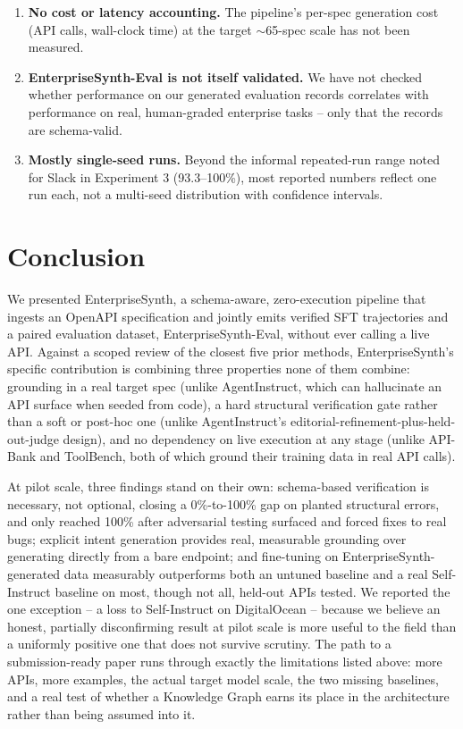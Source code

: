 \documentclass[11pt]{article}
\begin{document}
\begin{enumerate}
    data loses to a real Self-Instruct baseline on one of three held-out APIs (DigitalOcean); the
    proposed explanation (structural similarity to GitHub, which Self-Instruct's bootstrap leaned
    on) is a hypothesis, not a confirmed finding.
    \item \textbf{No cost or latency accounting.} The pipeline's per-spec generation cost (API
    calls, wall-clock time) at the target $\sim$65-spec scale has not been measured.
    \item \textbf{EnterpriseSynth-Eval is not itself validated.} We have not checked whether
    performance on our generated evaluation records correlates with performance on real,
    human-graded enterprise tasks -- only that the records are schema-valid.
    \item \textbf{Mostly single-seed runs.} Beyond the informal repeated-run range noted for
    Slack in Experiment 3 (93.3--100\%), most reported numbers reflect one run each, not a
    multi-seed distribution with confidence intervals.
\end{enumerate}

\section{Conclusion}
We presented EnterpriseSynth, a schema-aware, zero-execution pipeline that ingests an OpenAPI
specification and jointly emits verified SFT trajectories and a paired evaluation dataset,
EnterpriseSynth-Eval, without ever calling a live API. Against a scoped review of the closest five
prior methods, EnterpriseSynth's specific contribution is combining three properties none of them
combine: grounding in a real target spec (unlike AgentInstruct, which can hallucinate an API
surface when seeded from code), a hard structural verification gate rather than a soft or
post-hoc one (unlike AgentInstruct's editorial-refinement-plus-held-out-judge design), and no
dependency on live execution at any stage (unlike API-Bank and ToolBench, both of which ground
their training data in real API calls).

At pilot scale, three findings stand on their own: schema-based verification is necessary, not
optional, closing a 0\%-to-100\% gap on planted structural errors, and only reached 100\% after
adversarial testing surfaced and forced fixes to real bugs; explicit intent generation provides
real, measurable grounding over generating directly from a bare endpoint; and fine-tuning on
EnterpriseSynth-generated data measurably outperforms both an untuned baseline and a real
Self-Instruct baseline on most, though not all, held-out APIs tested. We reported the one
exception -- a loss to Self-Instruct on DigitalOcean -- because we believe an honest, partially
disconfirming result at pilot scale is more useful to the field than a uniformly positive one that
does not survive scrutiny. The path to a submission-ready paper runs through exactly the
limitations listed above: more APIs, more examples, the actual target model scale, the two missing
baselines, and a real test of whether a Knowledge Graph earns its place in the architecture rather
than being assumed into it.



\end{document}
